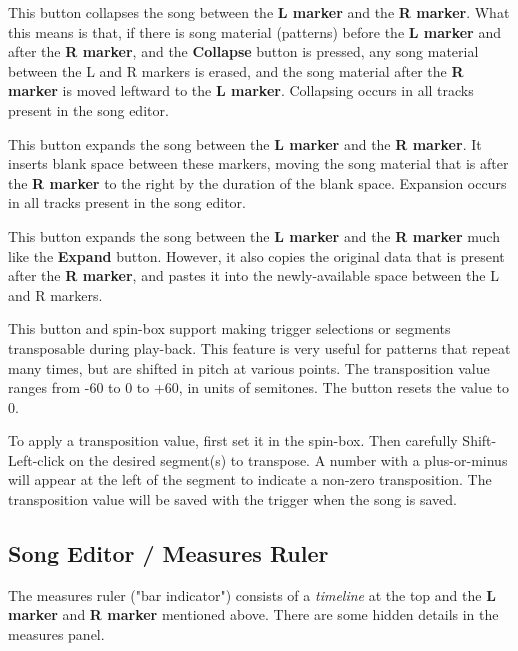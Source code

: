    This button collapses the song between the \textbf{L marker} and the
   \textbf{R marker}.
   What this means is that, if there is song material (patterns) before the
   \textbf{L marker} and after the \textbf{R marker},
   and the \textbf{Collapse} button is
   pressed, any song material between the L and R markers is erased, and
   the song material after the \textbf{R marker} is moved leftward to
   the \textbf{L marker}.
   Collapsing occurs in all tracks present in the song editor.

   This button expands the song between the
   \textbf{L marker} and the \textbf{R marker}.
   It inserts blank space between these markers, moving the song material
   that is after the \textbf{R marker}
   to the right by the duration of the blank space.
   Expansion occurs in all tracks present in the song editor.

   This button expands the song between the \textbf{L marker} and the
   \textbf{R marker} much like the \textbf{Expand} button.
   However, it also copies the original data that is present after the
   \textbf{R marker}, and pastes it into the newly-available space between
   the L and R markers.

   This button and spin-box support making trigger selections or segments
   transposable during play-back.  This feature is very useful
   for patterns that repeat many times, but are shifted in pitch at various
   points.
   The transposition value ranges from -60 to 0 to +60, in units of semitones.
   The button resets the value to 0.

   To apply a transposition value, first set it in the spin-box.
   Then carefully Shift-Left-click on the desired segment(s) to transpose.
   A number with a plus-or-minus will appear at the left of the segment to
   indicate a non-zero transposition.
   The transposition value will be saved with the trigger when the song is
   saved.

\subsection{Song Editor / Measures Ruler}
\label{subsec:song_editor_measures_ruler}

   The measures ruler ("bar indicator")
   consists of a \textsl{timeline} at the top and the 
   \textbf{L marker} and \textbf{R marker} mentioned above.
   There are some hidden details in the measures panel.

